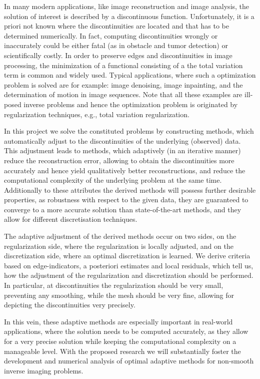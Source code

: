 \documentclass[enabledeprecatedfontcommands,cleardoublepage=empty,headsepline,twoside,11pt,DIV=15,BCOR=12mm,final]{scrartcl}
\begin{document}
In many modern applications, like image reconstruction and image analysis, the solution of interest is described by a discontinuous function. Unfortunately, it is a priori not known where the discontinuities  are located and that has to be determined numerically. In fact, computing discontinuities wrongly or inaccurately could be either fatal (as in obstacle and tumor detection) or scientifically costly.  %
In order to preserve edges and discontinuities  in image processing, the minimization of a functional consisting of a the total variation term is common and widely used. Typical applications, where such a optimization problem is solved are for example: image denoising, image inpainting, and the determination of motion in image sequences. Note that all these examples are ill-posed inverse problems and hence the optimization problem is originated by regularization techniques, e.g., total variation regularization.

In this project we solve the constituted problems by constructing methods, which automatically adjust to the discontinuities of the underlying (observed) data. This adjustment leads to methods, which adaptively (in an iterative manner) reduce the reconstruction error, allowing to obtain the discontinuities more accurately and hence yield qualitatively better reconstructions, and reduce the computational complexity of the underlying problem at the same time. Additionally to these attributes the derived methods will possess further desirable properties, as robustness with respect to the given data, they are guaranteed to converge to a more accurate solution than state-of-the-art methods, and they allow for different discretisation techniques. 

The adaptive adjustment of the derived methods occur on two sides, on the regularization side, where the regularization is locally adjusted, and on the discretization side, where an optimal discretization is learned. We derive criteria based on edge-indicators, a posteriori estimates and local residuals, which tell us, how the adjustment of the regularization and discretization should be performed. In particular, at discontinuities the regularization should be very small, preventing any smoothing, while the mesh should be very fine, allowing for depicting the discontinuities very precisely. 

In this vein, these adaptive methods are especially important in real-world applications, where the solution needs to be computed accurately, as they allow for a very precise solution while keeping the computational complexity on a manageable level. With the proposed research we will substantially foster the development and numerical analysis of optimal adaptive methods for non-smooth inverse imaging problems. %
\end{document}
